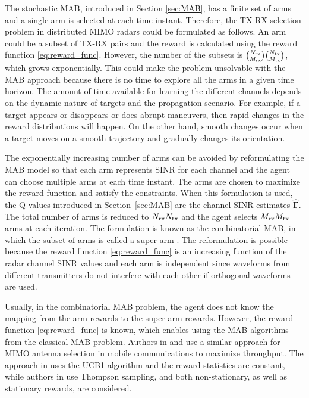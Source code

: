 \documentclass[english, 12pt, a4paper, elec, utf8, a-1b, online]{aaltothesis}
\numberwithin{equation}{section}
\newcommand{\vsinrb}{\widehat{\boldsymbol{\Gamma}}}
\begin{document}
The stochastic MAB, introduced in Section \ref{sec:MAB}, has a finite set of arms and a single arm is selected at each time instant.
Therefore, the TX-RX selection problem in distributed MIMO radars could be formulated as follows.
An arm could be a subset of TX-RX pairs and the reward is calculated using the reward function \eqref{eq:reward_func}.
However, the number of the subsets is $\binom{{N_{\text{rx}}}}{{M_{\text{rx}}}}\binom{{N_{\text{tx}}}}{{M_{\text{tx}}}}$, which grows exponentially. This could make the problem unsolvable with the MAB approach because there is no time to explore all the arms in a given time horizon.
The amount of time available for learning the different channels depends on the dynamic nature of targets and the propagation scenario.
For example, if a target appears or disappears or does abrupt maneuvers, then rapid changes in the reward distributions will happen. 
On the other hand, smooth changes occur when a target moves on a smooth trajectory and gradually changes its orientation.

The exponentially increasing number of arms can be avoided by reformulating the MAB model so that each arm represents SINR for each channel and the agent can choose multiple arms at each time instant.
The arms are chosen to maximize the reward function and satisfy the constraints.
When this formulation is used, the Q-values introduced in Section~\ref{sec:MAB} are the channel SINR estimates $\vsinrb$.
The total number of arms is reduced to ${N_{\text{rx}}}{N_{\text{tx}}}$ and the agent selects ${M_{\text{rx}}}{M_{\text{tx}}}$ arms at each iteration.
The formulation is known as the combinatorial MAB, in which the subset of arms is called a super arm \cite{Chen2014}.
The reformulation is possible because the reward function \eqref{eq:reward_func} is an increasing function of the radar channel SINR values and each arm is independent since waveforms from different transmitters do not interfere with each other if orthogonal waveforms are used.

Usually, in the combinatorial MAB problem, the agent does not know the mapping from the arm rewards to the super arm rewards.
However, the reward function \eqref{eq:reward_func} is known, which enables using the MAB algorithms from the classical MAB problem.
Authors in \cite{Mukherjee2012} and \cite{Kuai2019} use a similar approach for MIMO antenna selection in mobile communications to maximize throughput.
The approach in \cite{Mukherjee2012} uses the UCB1 algorithm and the reward statistics are constant, while authors in \cite{Kuai2019} use Thompson sampling, and both non-stationary, as well as stationary rewards, are considered.
\end{document}
